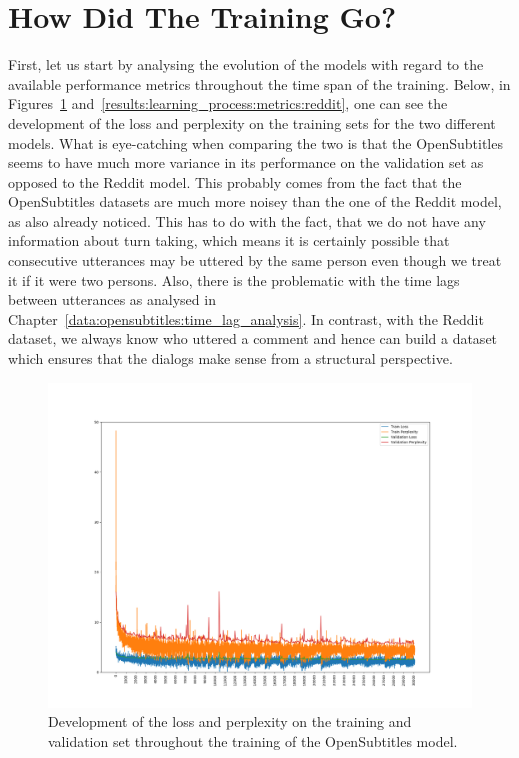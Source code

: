 \section{How Did The Training Go?}
First, let us start by analysing the evolution of the models with regard to the available performance metrics throughout the time span of the training. Below, in Figures~\ref{results:learning_process:metrics:opensubtitles} and~\ref{results:learning_process:metrics:reddit}, one can see the development of the loss and perplexity on the training sets for the two different models. What is eye-catching when comparing the two is that the OpenSubtitles seems to have much more variance in its performance on the validation set as opposed to the Reddit model. This probably comes from the fact that the OpenSubtitles datasets are much more noisey than the one of the Reddit model, as \cite{Vinyals:2015} also already noticed. This has to do with the fact, that we do not have any information about turn taking, which means it is certainly possible that consecutive utterances may be uttered by the same person even though we treat it if it were two persons. Also, there is the problematic with the time lags between utterances as analysed in Chapter~\ref{data:opensubtitles:time_lag_analysis}. In contrast, with the Reddit dataset, we always know who uttered a comment and hence can build a dataset which ensures that the dialogs make sense from a structural perspective.

\begin{figure}[H]
	\includegraphics[width=\linewidth]{img/plots/opensubtitles_not_reversed/train_metrics.png}
	\caption{Development of the loss and perplexity on the training and validation set throughout the training of the OpenSubtitles model.}
	\label{results:learning_process:metrics:opensubtitles}
\end{figure}

